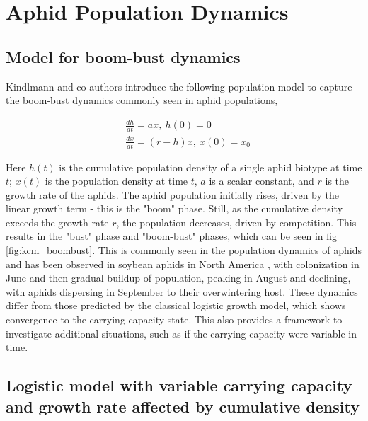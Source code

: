 \documentclass[sn-mathphys-num]{sn-jnl}
\numberwithin{equation}{section}
\numberwithin{equation}{section}
\begin{document}
\section{Aphid Population Dynamics}
\label{Aphid Population Dynamics}
\subsection{Model for boom-bust dynamics}

Kindlmann and co-authors \cite{kindlmann2010modelling} introduce the following population model to capture the boom-bust dynamics commonly seen in aphid populations,

 \begin{equation}
\label{eq:cl1}
\begin{aligned}
& \frac{dh}{dt} = a x,  \ h(0)=0 \\
& \frac{dx}{dt} =  (r-h)x,  \ x(0)=x_{0}
\end{aligned}
\end{equation}


Here $h (t)$ is the cumulative population density of a single aphid biotype at time $t$; $x(t)$ is the population density at time $t$, $a$ is a scalar constant, and $r$ is the growth rate of the aphids. The aphid population initially rises, driven by the linear growth term - this is the "boom" phase. Still, as the cumulative density exceeds the growth rate $r$, the population decreases, driven by competition. This results in the "bust" phase \cite{kot2001elements} and "boom-bust" phases, which can be seen in fig \ref{fig:kcm_boombust}. This is commonly seen in the population dynamics of aphids and has been observed in soybean aphids in North America \cite{catangui2009soybean}, with colonization in June and then gradual buildup of population, peaking in August and declining, with aphids dispersing in September to their overwintering host.
These dynamics differ from those predicted by the classical logistic growth model, which shows convergence to the carrying capacity state.  This also provides a framework to investigate additional situations, such as if the carrying capacity were variable in time.


\subsection{Logistic model with variable carrying
capacity and growth rate affected by
cumulative density}
\end{document}
